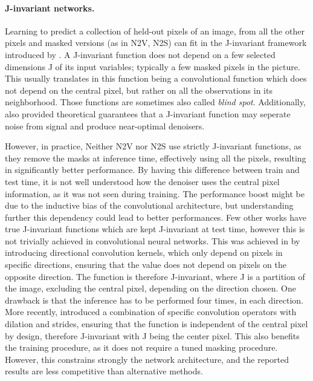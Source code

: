 \documentclass{article}
\begin{document}
\paragraph{J-invariant networks.}
Learning to predict a collection of held-out pixels of an image, from all the other pixels and masked versions (as in N2V, N2S) can fit in the J-invariant framework introduced by \cite{batson2019noise2self}.
A J-invariant function does not depend on a few selected dimensions J of its input variables; typically a few masked pixels
in the picture.
This usually translates in this function being a convolutional function which does not depend on the central pixel, but rather on all the observations in its neighborhood. Those functions are sometimes also called \textit{blind spot}.
 Additionally, \cite{batson2019noise2self} also provided theoretical guarantees that a J-invariant function may seperate noise from signal and produce near-optimal denoisers.

However, in practice, Neither N2V nor N2S use strictly J-invariant functions, as they remove the masks at inference time,
effectively using all the pixels, resulting in significantly better performance. By having this difference between train and test time, it is not well understood how the denoiser uses the central pixel information, as it was not seen during training. The performance boost might be due to the inductive bias of the convolutional architecture, but understanding further this dependency could lead to better performances.
Few other works have true J-invariant functions which are kept J-invariant at test time, however this is not trivially achieved in convolutional neural networks. This was achieved in \cite{laine2019high} by introducing directional convolution kernels, which only depend on pixels in specific directions, ensuring that the value does not depend on pixels on the opposite direction. The function is therefore J-invariant, where J is a partition of the image, excluding the central pixel, depending on the direction chosen. One drawback is that the inference has to be performed four times, in each direction.
More recently, \cite{lee2020noise2kernel} introduced a combination of specific convolution operators with dilation and strides, ensuring that the function is independent of the central pixel by design, therefore J-invariant with J being the center pixel. This also benefits the training procedure, as it does not require a tuned masking procedure. However, this constrains strongly the network architecture, and the reported results are less competitive than alternative methods.
\end{document}
